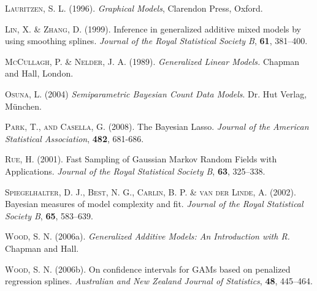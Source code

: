 \begin{thebibliography}{99}
 {\scshape Lauritzen, S. L.} (1996).
 {\it Graphical Models},
 Clarendon Press, Oxford.

 {\scshape Lin, X. \& Zhang, D.} (1999).
 Inference in generalized additive mixed models by using smoothing splines.
 {\it Journal of the Royal Statistical Society B}, {\bf 61}, 381--400.

 {\scshape McCullagh, P. \& Nelder, J. A.} (1989).
 {\it Generalized Linear Models.}
 Chapman and Hall, London.

 {\scshape Osuna, L.} (2004)
 {\it Semiparametric Bayesian Count Data Models}.
 Dr. Hut Verlag, M\"{u}nchen.
 
 {\scshape Park, T., and Casella, G.} (2008). The Bayesian Lasso. {\it Journal 
 of the American Statistical Association}, {\bf 482}, 681-686. 

 {\scshape Rue, H.} (2001).
 Fast Sampling of Gaussian Markov Random Fields with Applications.
 {\it Journal of the Royal Statistical Society B}, {\bf 63}, 325--338.

 {\scshape Spiegelhalter, D. J., Best, N. G., Carlin, B. P. \& van der Linde, A.} (2002).
 Bayesian measures of model complexity and fit.
 {\it Journal of the Royal Statistical Society B}, {\bf 65}, 583--639.

 {\scshape Wood, S. N.} (2006a).
 {\it Generalized Additive Models: An Introduction with R.}
 Chapman and Hall.

 {\scshape Wood, S. N.} (2006b).
 On confidence intervals for GAMs based on penalized regression splines.
 {\it Australian and New Zealand Journal of Statistics}, {\bf 48}, 445--464.
\end{thebibliography}









